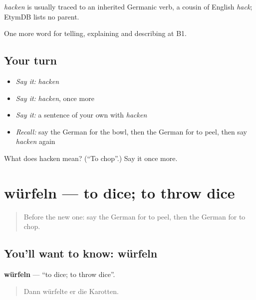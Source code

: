 \begin{cousinweb}
\emph{hacken} is usually traced to an inherited Germanic verb, a cousin of English \emph{hack}; EtymDB lists no parent.
\end{cousinweb}

\begin{grammarlens}[title={What you've built}]
One more word for telling, explaining and describing at B1.
\end{grammarlens}

\subsection*{Your turn}
\begin{itemize}
\raggedright
  \item \emph{Say it:} \emph{hacken}
  \item \emph{Say it:} \emph{hacken}, once more
  \item \emph{Say it:} a sentence of your own with \emph{hacken}
  \item \emph{Recall:} say the German for the bowl, then the German for to peel, then say \emph{hacken} again
\end{itemize}

\begin{tcolorbox}[breakable,colback=teal!4,colframe=teal!35!black,title={Before you move on}]
What does hacken mean? (\textquotedblleft{}To chop\textquotedblright{}.) Say it once more.
\end{tcolorbox}
\section[würfeln]{würfeln — to dice; to throw dice}

\label{lesson:GE-C323-wuerfeln}



\begin{quote}
Before the new one: say the German for to peel, then the German for to chop.
\end{quote}

\subsection*{You'll want to know: würfeln}
\textbf{würfeln} — \textquotedblleft{}to dice; to throw dice\textquotedblright{}.

\begin{quote}
Dann würfelte er die Karotten.
\end{quote}

